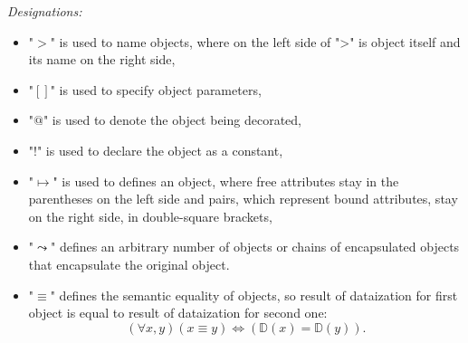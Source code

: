 \emph{Designations:}
\begin{itemize}
\item "$>$" is used to name objects, where on the left side of ">" is object itself and its name on the right side,
\item "$[]$" is used to specify object parameters,
\item "$@$" is used to denote the object being decorated,
\item "$!$" is used to declare the object as a constant,
\item "$\mapsto$" is used to defines an object, where free attributes stay in the parentheses on the left side and pairs, which represent bound attributes, stay on the right side, in double-square brackets,
\item "$\leadsto$" defines an arbitrary number of objects or chains of encapsulated objects that encapsulate the original object.
\item "$\equiv$" defines the semantic equality of objects, so result of dataization for first object is equal to result of dataization for second one:
\begin{equation}
(\forall{x, y}) (x \equiv y) \Leftrightarrow (\mathbb{D}(x) = \mathbb{D}(y)) .
\end{equation}
\end{itemize}

